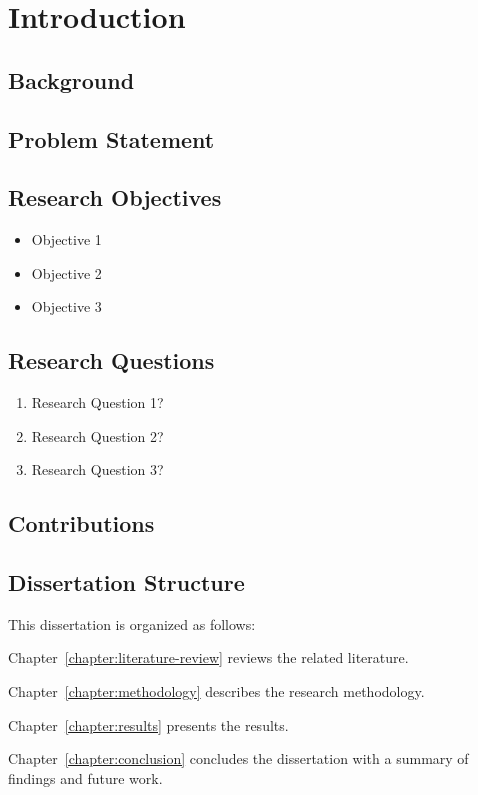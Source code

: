\chapter{Introduction}
\label{chapter:introduction}


\section{Background}

\section{Problem Statement}

\section{Research Objectives}
\begin{itemize}
    \item Objective 1
    \item Objective 2
    \item Objective 3
\end{itemize}

\section{Research Questions}
\begin{enumerate}
    \item Research Question 1?
    \item Research Question 2?
    \item Research Question 3?
\end{enumerate}

\section{Contributions}

\section{Dissertation Structure}

This dissertation is organized as follows:

Chapter~\ref{chapter:literature-review} reviews the related literature.

Chapter~\ref{chapter:methodology} describes the research methodology.

Chapter~\ref{chapter:results} presents the results.

Chapter~\ref{chapter:conclusion} concludes the dissertation with a summary of findings and future work.

